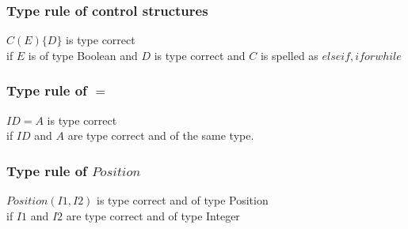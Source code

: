	\subsubsection{Type rule of control structures}
		$C(E)\{D\}$ is type correct\\
		if $E$ is of type Boolean and $D$ is type correct
		and $C$ is spelled as $else if, if or while$
		
	\subsubsection*{Type rule of $=$}
		$ID = A$ is type correct\\
		if $ID$ and $A$ are type correct and of the same type.
	\subsubsection*{Type rule of $Position$}
		$Position(I1,I2)$ is type correct and of type Position\\
		if $I1$ and $I2$ are type correct and of type Integer
	